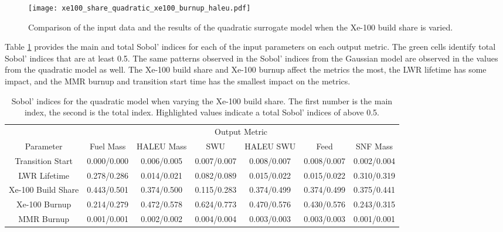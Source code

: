 \begin{figure}
    \centering 
    \texttt{[image: xe100\_share\_quadratic\_xe100\_burnup\_haleu.pdf]}
    \caption{Comparison of the input data and the results of the quadratic 
    surrogate model when the Xe-100 build share is varied.}
    \label{fig:s7_xe100_quadratic}
\end{figure}

Table \ref{tab:s7_sobol_xe100_quadratic} provides the main and total Sobol' 
indices for each of the input parameters on each output metric. The 
green cells identify total Sobol' indices that are at least 0.5. The same patterns 
observed in the Sobol' indices from the Gaussian model are 
observed in the values from the quadratic model as well. The Xe-100 build share 
and Xe-100 burnup affect the metrics the most, the \gls{LWR} lifetime has some 
impact, and the \gls{MMR} burnup and transition start time has the smallest impact 
on the metrics. 

\begin{table}
    \centering
    \caption{Sobol' indices for the quadratic model when varying the Xe-100 
    build share. The first number is the main index, the second is the total 
    index. Highlighted 
    values indicate a total Sobol' indices of above 0.5.}
    \label{tab:s7_sobol_xe100_quadratic}
    \begin{tabular}{c c c c c c c}
        \hline
        & \multicolumn{6}{c}{Output Metric} \\
        Parameter & Fuel Mass & HALEU Mass & SWU & HALEU SWU & Feed & SNF Mass \\
        \hline
        Transition Start & 0.000/0.000& 0.006/0.005 & 0.007/0.007 &
                           0.008/0.007 & 0.008/0.007 & 0.002/0.004\\
        LWR Lifetime & 0.278/0.286 & 0.014/0.021 & 0.082/0.089 & 
                       0.015/0.022 & 0.015/0.022 & 0.310/0.319\\
        Xe-100 Build Share & \cellcolor{green!25}0.443/0.501 & \cellcolor{green!25}0.374/0.500 & 0.115/0.283 & 
                             0.374/0.499 & 0.374/0.499 & 0.375/0.441\\
        Xe-100 Burnup & 0.214/0.279 & \cellcolor{green!25}0.472/0.578 & \cellcolor{green!25}0.624/0.773 &
                        \cellcolor{green!25}0.470/0.576 & \cellcolor{green!25}0.430/0.576 & 0.243/0.315\\
        MMR Burnup & 0.001/0.001 & 0.002/0.002 & 0.004/0.004 &
                     0.003/0.003 & 0.003/0.003 & 0.001/0.001\\
        \hline        
    \end{tabular}
\end{table}

